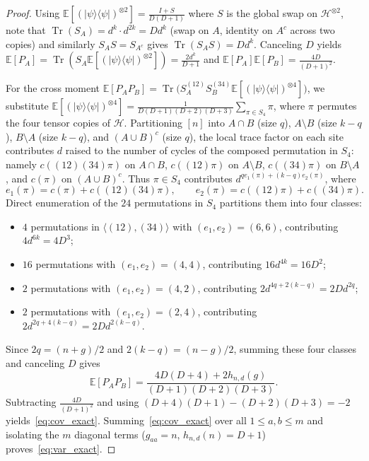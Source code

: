 \documentclass[11pt,reqno]{amsart}
\theoremstyle{definition}
\theoremstyle{remark}
\newcommand{\E}{\mathbb{E}}
\newcommand{\Tr}{\operatorname{Tr}}
\begin{document}
\begin{proof}
Using $\E[(|\psi\rangle\langle\psi|)^{\otimes 2}] = \frac{I + S}{D(D+1)}$ where $S$ is the global swap on $\mathcal{H}^{\otimes 2}$, note that $\Tr(S_A) = d^k \cdot d^{2k} = D d^k$ (swap on $A$, identity on $A^c$ across two copies) and similarly $S_A S = S_{A^c}$ gives $\Tr(S_A S) = D d^k$. Canceling $D$ yields $\E[P_A] = \Tr(S_A \E[(|\psi\rangle\langle\psi|)^{\otimes 2}]) = \frac{2 d^k}{D+1}$ and $\E[P_A]\E[P_B] = \frac{4D}{(D+1)^2}$.

For the cross moment $\E[P_A P_B] = \Tr\bigl(S_A^{(12)} S_B^{(34)} \E[(|\psi\rangle\langle\psi|)^{\otimes 4}]\bigr)$, we substitute $\E[(|\psi\rangle\langle\psi|)^{\otimes 4}] = \frac{1}{D(D+1)(D+2)(D+3)} \sum_{\pi \in S_4} \pi$, where $\pi$ permutes the four tensor copies of $\mathcal{H}$. Partitioning $[n]$ into $A\cap B$ (size $q$), $A\setminus B$ (size $k-q$), $B\setminus A$ (size $k-q$), and $(A\cup B)^c$ (size $q$), the local trace factor on each site contributes $d$ raised to the number of cycles of the composed permutation in $S_4$: namely $c((12)(34)\pi)$ on $A\cap B$, $c((12)\pi)$ on $A\setminus B$, $c((34)\pi)$ on $B\setminus A$, and $c(\pi)$ on $(A\cup B)^c$. Thus $\pi \in S_4$ contributes $d^{q e_1(\pi) + (k-q) e_2(\pi)}$, where
\[
e_1(\pi) = c(\pi) + c((12)(34)\pi), \qquad e_2(\pi) = c((12)\pi) + c((34)\pi).
\]
Direct enumeration of the $24$ permutations in $S_4$ partitions them into four classes:
\begin{itemize}
\item $4$ permutations in $\langle (12),(34)\rangle$ with $(e_1,e_2) = (6,6)$, contributing $4 d^{6k} = 4D^3$;
\item $16$ permutations with $(e_1,e_2) = (4,4)$, contributing $16 d^{4k} = 16D^2$;
\item $2$ permutations with $(e_1,e_2) = (4,2)$, contributing $2 d^{4q+2(k-q)} = 2D d^{2q}$;
\item $2$ permutations with $(e_1,e_2) = (2,4)$, contributing $2 d^{2q+4(k-q)} = 2D d^{2(k-q)}$.
\end{itemize}
Since $2q = (n+g)/2$ and $2(k-q) = (n-g)/2$, summing these four classes and canceling $D$ gives
\[
\E[P_A P_B] = \frac{4D(D+4) + 2 h_{n,d}(g)}{(D+1)(D+2)(D+3)}.
\]
Subtracting $\frac{4D}{(D+1)^2}$ and using $(D+4)(D+1) - (D+2)(D+3) = -2$ yields~\eqref{eq:cov_exact}. Summing~\eqref{eq:cov_exact} over all $1 \le a,b \le m$ and isolating the $m$ diagonal terms ($g_{aa} = n$, $h_{n,d}(n) = D+1$) proves~\eqref{eq:var_exact}.
\end{proof}
\end{document}
